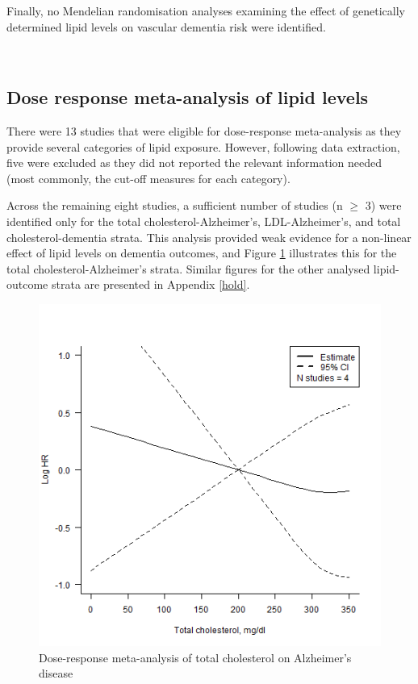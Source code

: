 \documentclass[a4paper, twoside]{templates/ociamthesis}
\begin{document}
Finally, no Mendelian randomisation analyses examining the effect of genetically determined lipid levels on vascular dementia risk were identified.

~

\hypertarget{dose-response-results}{%
\subsection{Dose response meta-analysis of lipid levels}\label{dose-response-results}}

There were 13 studies that were eligible for dose-response meta-analysis as they provide several categories of lipid exposure. However, following data extraction, five were excluded as they did not reported the relevant information needed (most commonly, the cut-off measures for each category).

Across the remaining eight studies, a sufficient number of studies (n \(\geqslant\) 3) were identified only for the total cholesterol-Alzheimer's, LDL-Alzheimer's, and total cholesterol-dementia strata. This analysis provided weak evidence for a non-linear effect of lipid levels on dementia outcomes, and Figure \ref{fig:lipidsDoseResponse} illustrates this for the total cholesterol-Alzheimer's strata. Similar figures for the other analysed lipid-outcome strata are presented in Appendix \ref{hold}.





\begin{figure}[H]

{\centering \includegraphics[width=0.7\linewidth]{figures/sys-rev/dr_AD_TC} 

}

\caption[Dose-response meta-analysis of total cholesterol]{Dose-response meta-analysis of total cholesterol on Alzheimer's disease}\label{fig:lipidsDoseResponse}
\end{figure}
\end{document}
